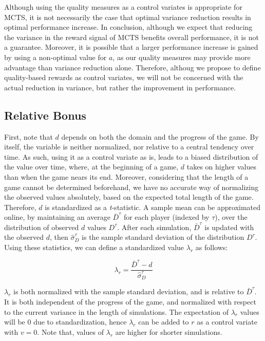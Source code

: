 \documentclass{ecai2014}
\begin{document}
Although using the quality measures as a control variates is appropriate for MCTS, it is not necessarily the case that optimal variance reduction results in optimal performance increase. In conclusion, although we expect that reducing the variance in the reward signal of MCTS benefits overall performance, it is not a guarantee. Moreover, it is possible that a larger performance increase is gained by using a non-optimal value for $a$, as our quality measures may provide more advantage than variance reduction alone. Therefore, althoug we propose to define quality-based rewards as control variates, we will not be concerned with the actual reduction in variance, but rather the improvement in performance.

\subsection{Relative Bonus}
\label{subsec:rb}
First, note that $d$ depends on both the domain and the progress of the game. By itself, the variable is neither normalized, nor relative to a central tendency over time. As such, using it as a control variate as is, leads to a biased distribution of the value over time, where, at the beginning of a game, $d$ takes on higher values than when the game nears its end. Moreover, considering that the length of a game cannot be determined beforehand, we have no accurate way of normalizing the observed values absolutely, based on the expected total length of the game. Therefore, $d$ is standardized as a \emph{t}-statistic. A sample mean can be approximated online, by maintaining an average $\bar{D}^\tau$ for each player (indexed by $\tau$), over the distribution of observed $d$ values $D^\tau$. After each simulation, $\bar{D}^\tau$ is updated with the observed $d$, then $\hat{\sigma}^\tau_D$ is the sample standard deviation of the distribution $D^\tau$. Using these statistics, we can define a standardized value $\lambda_r$ as follows:

\begin{equation}
\lambda_r = \frac{\bar{D}^\tau - d}{\hat{\sigma}^\tau_D}
\end{equation}

$\lambda_r$ is both normalized with the sample standard deviation, and is relative to $\bar{D}^\tau$. It is both independent of the progress of the game, and normalized with respect to the current variance in the length of simulations. The expectation of $\lambda_r$ values will be 0 due to standardization, hence $\lambda_r$ can be added to $r$ as a control variate with $v = 0$. Note that, values of $\lambda_r$ are higher for shorter simulations.
\end{document}
